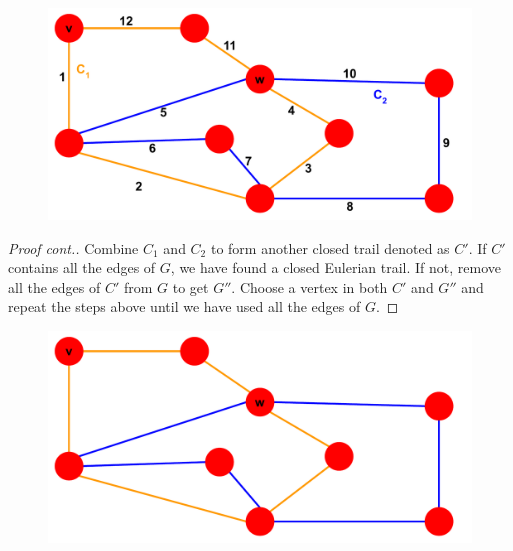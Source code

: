 \documentclass{beamer}
\begin{document}
\begin{frame}[t]
\begin{figure}
	\end{figure}
\end{frame}

\begin{frame}
	\begin{figure}
		\centering
		\includegraphics[scale=.40]{pictures/c'_traversal.pdf}
	\end{figure}
\end{frame}

\begin{frame}[t]
	\begin{proof}[Proof cont.]
		Combine $C_1$ and $C_2$ to form another closed trail denoted as $C'$. If 
		$C'$ contains all the edges of $G$, we have found a closed Eulerian trail. If not, 
		remove all the edges of $C'$ from $G$ to get $G''$. Choose a vertex in both $C'$ and 
		$G''$ and repeat the steps above until we have used all the edges of $G$.
	\end{proof}

	\begin{figure}
		\centering
		\includegraphics[scale=.25]{pictures/c'.pdf}
	\end{figure}
\end{frame}
\end{document}
